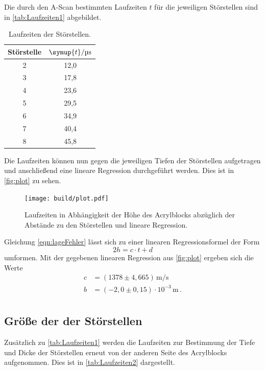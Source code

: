 Die durch den A-Scan bestimmten Laufzeiten $t$ für die jeweiligen Störstellen sind in \autoref{tab:Laufzeiten1} abgebildet.
\begin{table}[H]
  \centering
  \begin{tabular}{c c}
    \toprule
    Störstelle & $\symup{t}/\unit{\micro\second}$ \\
    \midrule
     2 & 12,0 \\
     3 & 17,8 \\
     4 & 23,6 \\
     5 & 29,5 \\
     6 & 34,9 \\
     7 & 40,4 \\
     8 & 45,8 \\
    \bottomrule
  \end{tabular}
  \caption{Laufzeiten der Störstellen.}
  \label{tab:Laufzeiten1}
\end{table}

Die Laufzeiten können nun gegen die jeweiligen Tiefen der Störstellen aufgetragen und anschließend eine
lineare Regression durchgeführt werden. Dies ist in \autoref{fig:plot} zu sehen.
\begin{figure}
  \centering
  \texttt{[image: build/plot.pdf]}
  \caption{Laufzeiten in Abhängigkeit der Höhe des Acrylblocks abzüglich der Abstände zu den Störstellen und
  lineare Regression.}
  \label{fig:plot}
\end{figure}

Gleichung \eqref{eqn:lageFehler} lässt sich zu einer linearen Regressionsformel der Form
\begin{equation*}
  2h = c\cdot t + d
\end{equation*}
umformen. Mit der gegebenen linearen Regression aus \autoref{fig:plot} ergeben sich die Werte
\begin{align*}
  c &= (1378 \pm 4,665)\,\unit{\meter\per\second} \\
  b &= (-2,0 \pm 0,15)\cdot 10^{-3}\,\unit{\meter}\,. \\
\end{align*}


\subsection{Größe der der Störstellen}

Zusätzlich zu \autoref{tab:Laufzeiten1} werden die Laufzeiten zur Bestimmung der Tiefe und Dicke der Störstellen erneut von der anderen Seite des Acrylblocks
aufgenommen. Dies ist in \autoref{tab:Laufzeiten2} dargestellt.

